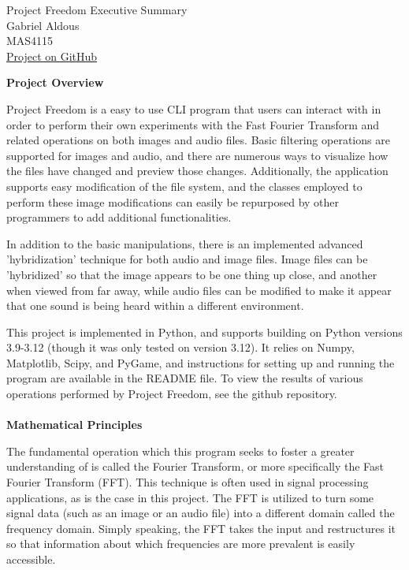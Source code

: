 \documentclass[notitlepage]{article}
\begin{document}

\begin{center}
	Project Freedom Executive Summary
	\\
	Gabriel Aldous
	\\
	MAS4115
	\\
	\href{https://github.com/Sn00pyW00dst0ck/project_freedom}{Project on GitHub}
\end{center}
\textbf{Project Overview}

Project Freedom is a easy to use CLI program that
users can interact with in order to perform their own experiments
with the Fast Fourier Transform and related operations on both images and audio files.
Basic filtering operations are supported for images and audio, and
there are numerous ways to visualize how the files have changed
and preview those changes. Additionally, the application supports
easy modification of the file system, and the classes employed
to perform these image modifications can easily be repurposed by
other programmers to add additional functionalities.

In addition to the basic manipulations, there is an implemented
advanced 'hybridization' technique for both audio and image files.
Image files can be 'hybridized' so that the image appears to be one
thing up close, and another when viewed from far away, while audio
files can be modified to make it appear that one sound is being heard
within a different environment.

This project is implemented in Python, and supports building on
Python versions 3.9-3.12 (though it was only tested on version 3.12).
It relies on Numpy, Matplotlib, Scipy, and PyGame, and instructions for
setting up and running the program are available in the README file.
To view the results of various operations performed by Project Freedom,
see the github repository.
\\\\
\textbf{Mathematical Principles}

The fundamental operation which this program seeks to
foster a greater understanding of is called the Fourier
Transform, or more specifically the Fast Fourier Transform (FFT).
This technique is often used in signal processing applications,
as is the case in this project. The FFT is utilized to turn some
signal data (such as an image or an audio file) into a different domain
called the frequency domain. Simply speaking, the FFT takes the input and
restructures it so that information about which frequencies are more prevalent
is easily accessible.
\end{document}
